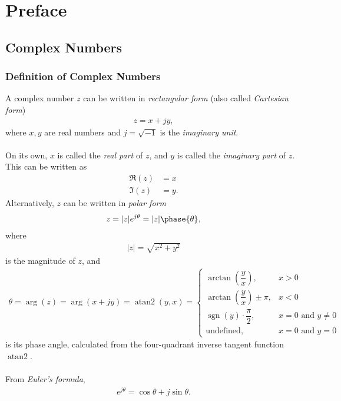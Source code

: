 \documentclass{report}
\begin{document}
\chapter*{Preface}

\section*{Complex Numbers}
\subsection*{Definition of Complex Numbers}
A complex number $z$ can be written in \emph{rectangular form} (also called \emph{Cartesian form})
\begin{align}
    z = x + jy,
\end{align}
where $x,y$ are real numbers and $j=\sqrt{-1}$ is the \emph{imaginary unit}. 
\\ \\
On its own, $x$ is called the \emph{real part} of $z$, and $y$ is called the \emph{imaginary part} of $z$. This can be written as 
\begin{align}
    \Re(z) &= x \\
    \Im(z) &= y.
\end{align}
Alternatively, $z$ can be written in \emph{polar form}
\begin{align}
    z = |z|e^{j\theta} = |z|\phase{\theta},
\end{align}
where 
\begin{align}
    |z|=\sqrt{x^2+y^2}
\end{align} 
is the magnitude of $z$, and 
\begin{align}
    \theta = \arg(z) = \arg(x+jy) = \operatorname{atan2}(y,x) = 
    \begin{cases}
        \arctan\left(\dfrac{y}{x}\right), & x > 0 \\[0.25cm]
        \arctan\left(\dfrac{y}{x}\right) \pm \pi, & x < 0 \\[0.25cm]
        \operatorname{sgn}(y)\cdot\dfrac{\pi}{2}, & x = 0 \text{ and } y \neq 0 \\[0.25cm]
        \text{undefined}, & x = 0 \text{ and } y = 0 
    \end{cases}
\end{align}
is its phase angle, calculated from the four-quadrant inverse tangent function $\operatorname{atan2}$.
\\ \\
From \emph{Euler's formula},
\begin{align}
    e^{j\theta} = \cos\theta + j\sin\theta.
\end{align}
\end{document}
